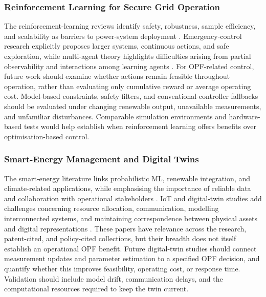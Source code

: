 \documentclass[a4paper,fleqn]{cas-sc}
\begin{document}
\subsubsection{Reinforcement Learning for Secure Grid Operation}\label{subsubsec:gaps_reinforcement}

The reinforcement-learning reviews identify safety, robustness, sample efficiency, and scalability as barriers to power-system deployment \cite{opfRef073,chen2022reinforcement}. Emergency-control research explicitly proposes larger systems, continuous actions, and safe exploration, while multi-agent theory highlights difficulties arising from partial observability and interactions among learning agents \cite{opfRef064,opfRef085}. For OPF-related control, future work should examine whether actions remain feasible throughout operation, rather than evaluating only cumulative reward or average operating cost. Model-based constraints, safety filters, and conventional-controller fallbacks should be evaluated under changing renewable output, unavailable measurements, and unfamiliar disturbances. Comparable simulation environments and hardware-based tests would help establish when reinforcement learning offers benefits over optimisation-based control.

\subsubsection{Smart-Energy Management and Digital Twins}\label{subsubsec:gaps_digital_twins}

The smart-energy literature links probabilistic ML, renewable integration, and climate-related applications, while emphasising the importance of reliable data and collaboration with operational stakeholders \cite{ahmad2022data,opfRef084,rolnick2022tackling}. IoT and digital-twin studies add challenges concerning resource allocation, communication, modelling interconnected systems, and maintaining correspondence between physical assets and digital representations \cite{opfRef032,opfRef089,thelen2022comprehensive}. These papers have relevance across the research, patent-cited, and policy-cited collections, but their breadth does not itself establish an operational OPF benefit. Future digital-twin studies should connect measurement updates and parameter estimation to a specified OPF decision, and quantify whether this improves feasibility, operating cost, or response time. Validation should include model drift, communication delays, and the computational resources required to keep the twin current.
\end{document}
